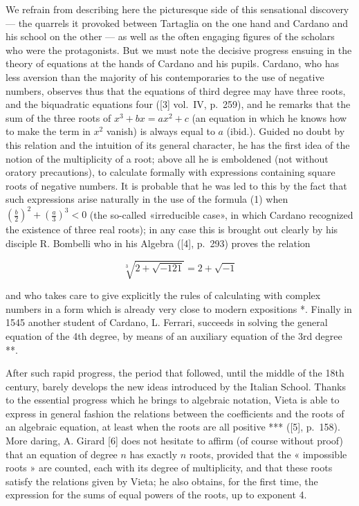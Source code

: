 We refrain from describing here the picturesque side of this sensational discovery --- the quarrels it provoked between Tartaglia on the one hand and Cardano and his school on the other --- as well as the often engaging figures of the scholars who were the protagonists. But we must note the decisive progress ensuing in the theory of equations at the hands of Cardano and his pupils. Cardano, who has less aversion than the majority of his contemporaries to the use of negative numbers, observes thus that the equations of third degree may have three roots, and the biquadratic equations four ({[}3{]} vol.~IV, p.~259), and he remarks that the sum of the three roots of \(x^3 + bx = ax^2 + c\) (an equation in which he knows how to make the term in \(x^2\) vanish) is always equal to \(a\) (ibid.). Guided no doubt by this relation and the intuition of its general character, he has the first idea of the notion of the multiplicity of a root; above all he is emboldened (not without oratory precautions), to calculate formally with expressions containing square roots of negative numbers. It is probable that he was led to this by the fact that such expressions arise naturally in the use of the formula (1) when \(\left(\frac{b}{2}\right)^{2} + \left(\frac{a}{3}\right)^{3} < 0\) (the so-called «irreducible case», in which Cardano recognized the existence of three real roots); in any case this is brought out clearly by his disciple R. Bombelli who in his Algebra ({[}4{]}, p.~293) proves the relation

\[
\sqrt [ 3 ]{2 + \sqrt {- 1 2 1}} = 2 + \sqrt {- 1}
\]

and who takes care to give explicitly the rules of calculating with complex numbers in a form which is already very close to modern expositions *. Finally in 1545 another student of Cardano, L. Ferrari, succeeds in solving the general equation of the 4th degree, by means of an auxiliary equation of the 3rd degree **.

After such rapid progress, the period that followed, until the middle of the 18th century, barely develops the new ideas introduced by the Italian School. Thanks to the essential progress which he brings to algebraic notation, Vieta is able to express in general fashion the relations between the coefficients and the roots of an algebraic equation, at least when the roots are all positive *** ({[}5{]}, p.~158). More daring, A. Girard {[}6{]} does not hesitate to affirm (of course without proof) that an equation of degree \(n\) has exactly \(n\) roots, provided that the « impossible roots » are counted, each with its degree of multiplicity, and that these roots satisfy the relations given by Vieta; he also obtains, for the first time, the expression for the sums of equal powers of the roots, up to exponent 4.

